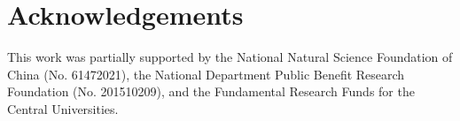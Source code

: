 \documentclass[conference]{IEEEtran}
\begin{document}
\section*{Acknowledgements}
This work was partially supported by the National Natural Science Foundation of China (No. 61472021), the National Department Public Benefit Research Foundation (No. 201510209), and the Fundamental Research Funds for the Central Universities.




%
%
%



\end{document}
